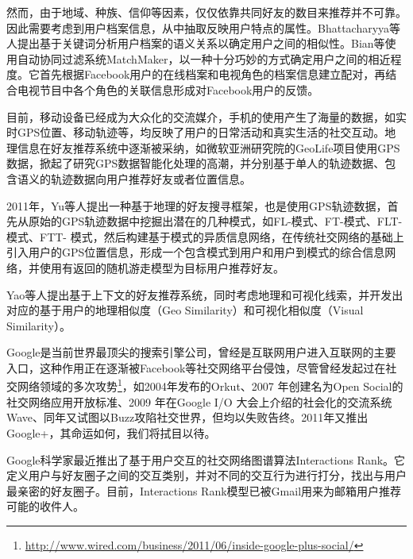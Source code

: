 然而，由于地域、种族、信仰等因素，仅仅依靠共同好友的数目来推荐并不可靠。因此需要考虑到用户档案信息，从中抽取反映用户特点的属性。Bhattacharyya等人提出基于关键词分析用户档案的语义关系以确定用户之间的相似性\cite{bhattacharyya2011analysis}。Bian等使用自动协同过滤系统MatchMaker，以一种十分巧妙的方式确定用户之间的相近程度\cite{bian2012matchmaker}。它首先根据Facebook用户的在线档案和电视角色的档案信息建立配对，再结合电视节目中各个角色的关联信息形成对Facebook用户的反馈。

目前，移动设备已经成为大众化的交流媒介，手机的使用产生了海量的数据，如实时GPS位置、移动轨迹等，均反映了用户的日常活动和真实生活的社交互动。地理信息在好友推荐系统中逐渐被采纳，如微软亚洲研究院的GeoLife项目使用GPS数据，掀起了研究GPS数据智能化处理的高潮，并分别基于单人的轨迹数据、包含语义的轨迹数据向用户推荐好友或者位置信息\cite{li2008mining,xiao2010finding,zheng2010geolife,zheng2011recommending}。

2011年，Yu等人提出一种基于地理的好友搜寻框架，也是使用GPS轨迹数据，首先从原始的GPS轨迹数据中挖掘出潜在的几种模式，如FL-模式、FT-模式、FLT-模式、FTT- 模式，然后构建基于模式的异质信息网络，在传统社交网络的基础上引入用户的GPS位置信息，形成一个包含模式到用户和用户到模式的综合信息网络，并使用有返回的随机游走模型为目标用户推荐好友。

Yao等人提出基于上下文的好友推荐系统\cite{yao2011context}，同时考虑地理和可视化线索，并开发出对应的基于用户的地理相似度（Geo Similarity）和可视化相似度（Visual Similarity）。

Google是当前世界最顶尖的搜索引擎公司，曾经是互联网用户进入互联网的主要入口，这种作用正在逐渐被Facebook等社交网络平台侵蚀，尽管曾经发起过在社交网络领域的多次攻势\footnote{\url{http://www.wired.com/business/2011/06/inside-google-plus-social/}}，如2004年发布的Orkut、2007 年创建名为Open Social的社交网络应用开放标准、2009 年在Google I/O 大会上介绍的社会化的交流系统Wave、同年又试图以Buzz攻陷社交世界，但均以失败告终。2011年又推出Google+，其命运如何，我们将拭目以待。

Google科学家最近推出了基于用户交互的社交网络图谱算法Interactions Rank。它定义用户与好友圈子之间的交互类别，并对不同的交互行为进行打分，找出与用户最亲密的好友圈子。目前，Interactions Rank模型已被Gmail用来为邮箱用户推荐可能的收件人。


